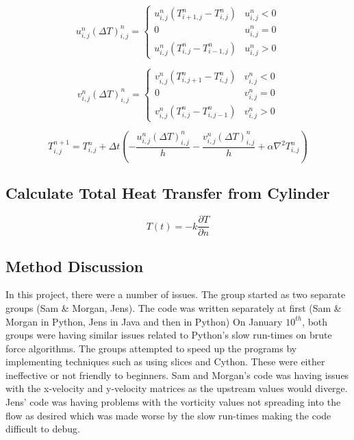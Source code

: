 \begin{equation}
    u_{i, j}^{n} (\Delta T)_{i, j}^{n} = \begin{cases} 
          u_{i, j}^{n} \left( T_{i + 1, j}^{n} - T_{i, j}^{n} \right) & u_{i, j}^{n} < 0 \\
          0 & u_{i, j}^n = 0 \\
          u_{i, j}^{n} \left( T_{i, j}^{n} - T_{i - 1, j}^{n} \right) & u_{i, j}^n > 0 
       \end{cases}
\end{equation}

\begin{equation}
    v_{i, j}^{n} (\Delta T)_{i, j}^{n} = \begin{cases} 
          v_{i, j}^{n} \left( T_{i, j + 1}^{n} - T_{i, j}^{n} \right) & v_{i, j}^{n} < 0 \\
          0 & v_{i, j}^n = 0 \\
          v_{i, j}^{n} \left( T_{i, j}^{n} - T_{i, j - 1}^{n} \right) & v_{i, j}^n > 0 
       \end{cases}
\end{equation}





\begin{equation}
    T_{i, j}^{n + 1} = T_{i, j}^{n} + \Delta t \left( -\frac{u_{i, j}^{n} (\Delta T)_{i, j}^{n}}{h} - \frac{ v_{i, j}^{n} (\Delta T)_{i, j}^{n}}{h} + \alpha \nabla^2 T_{i, j}^{n} \right)
\end{equation}




\subsection{Calculate Total Heat Transfer from Cylinder}
\begin{equation}
    T(t) = -k \frac{\partial T}{\partial n}
\end{equation}


\subsection{Method Discussion}
In this project, there were a number of issues. The group started as two separate groups (Sam \& Morgan, Jens). The code was written separately at first (Sam \& Morgan in Python, Jens in Java and then in Python) On January $10^{th}$, both groups were having similar issues related to Python's slow run-times on brute force algorithms. The groups attempted to speed up the programs by implementing techniques such as using slices and Cython. These were either ineffective or not friendly to beginners. Sam and Morgan's code was having issues with the x-velocity and y-velocity matrices as the upstream values would diverge. Jens' code was having problems with the vorticity values not spreading into the flow as desired which was made worse by the slow run-times making the code difficult to debug. \\

